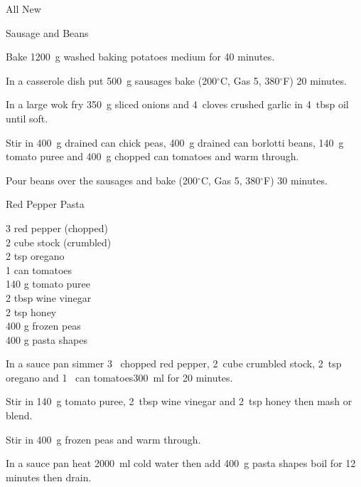 \begin{menu}{All New}
\begin{recipe}{2}{Sausage and Beans}
\begin{ingredients}
		\end{ingredients}
	
    \begin{instructions}
    \item 
      Bake 1200~g washed baking potatoes
      medium for 40 minutes.
    \item 
        In a casserole dish put
        500~g  sausages
        bake 
      (200$^{\circ}$C, Gas 5, 380$^{\circ}$F)
     20 minutes.
      \item 
        In a large wok fry
        350~g sliced onions
        and
        4~cloves crushed garlic
        in
        4~tbsp  oil
        until soft.
      \item 
        Stir in
        400~g drained can chick peas,
        400~g drained can borlotti beans,
        140~g  tomato puree
        and
        400~g chopped can tomatoes
        and warm through.
      \item 
        Pour beans over the sausages and bake 
      (200$^{\circ}$C, Gas 5, 380$^{\circ}$F)
     30 minutes.
      
    \end{instructions}
    \end{recipe}%
  
    \begin{recipe}{2}{Red Pepper Pasta}%
    
		\begin{ingredients}
		3  red pepper (chopped) \\
	2 cube stock (crumbled) \\
	2 tsp oregano  \\
	1  can tomatoes  \\
	140 g tomato puree  \\
	2 tbsp wine vinegar  \\
	2 tsp honey  \\
	400 g frozen peas  \\
	400 g pasta shapes  \\
	
		\end{ingredients}
	
    \begin{instructions}
    \item 
        In a sauce pan simmer
        3~ chopped red pepper,
        2~cube crumbled stock,
        2~tsp  oregano
        and
        1~  can tomatoes300~ml  
        for 20 minutes.
      \item 
        Stir in
        140~g  tomato puree,
        2~tbsp  wine vinegar
        and
        2~tsp  honey
        then mash or blend.
      \item 
        Stir in
        400~g  frozen peas
        and warm through.
      \item 
      In a sauce pan heat
      2000~ml  cold water then add
      400~g  pasta shapes
      boil for 12
      minutes then drain.
    

\end{instructions}
\end{recipe}
\end{menu}

